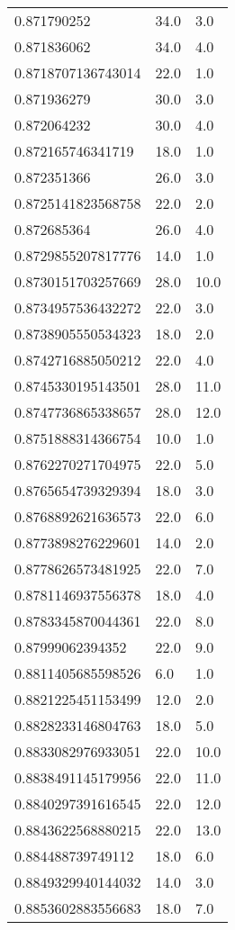 \begin{center}
\begin{supertabular}[H]{p{0.30\textwidth}p{0.05\textwidth}p{0.05\textwidth}}
0.871790252 & 34.0 & 3.0 \\ 
0.871836062 & 34.0 & 4.0 \\ 
0.8718707136743014 & 22.0 & 1.0 \\ 
0.871936279 & 30.0 & 3.0 \\ 
0.872064232 & 30.0 & 4.0 \\ 
0.872165746341719 & 18.0 & 1.0 \\ 
0.872351366 & 26.0 & 3.0 \\ 
0.8725141823568758 & 22.0 & 2.0 \\ 
0.872685364 & 26.0 & 4.0 \\ 
0.8729855207817776 & 14.0 & 1.0 \\ 
0.8730151703257669 & 28.0 & 10.0 \\ 
0.8734957536432272 & 22.0 & 3.0 \\ 
0.8738905550534323 & 18.0 & 2.0 \\ 
0.8742716885050212 & 22.0 & 4.0 \\ 
0.8745330195143501 & 28.0 & 11.0 \\ 
0.8747736865338657 & 28.0 & 12.0 \\ 
0.8751888314366754 & 10.0 & 1.0 \\ 
0.8762270271704975 & 22.0 & 5.0 \\ 
0.8765654739329394 & 18.0 & 3.0 \\ 
0.8768892621636573 & 22.0 & 6.0 \\ 
0.8773898276229601 & 14.0 & 2.0 \\ 
0.8778626573481925 & 22.0 & 7.0 \\ 
0.8781146937556378 & 18.0 & 4.0 \\ 
0.8783345870044361 & 22.0 & 8.0 \\ 
0.87999062394352 & 22.0 & 9.0 \\ 
0.8811405685598526 & 6.0 & 1.0 \\ 
0.8821225451153499 & 12.0 & 2.0 \\ 
0.8828233146804763 & 18.0 & 5.0 \\ 
0.8833082976933051 & 22.0 & 10.0 \\ 
0.8838491145179956 & 22.0 & 11.0 \\ 
0.8840297391616545 & 22.0 & 12.0 \\ 
0.8843622568880215 & 22.0 & 13.0 \\ 
0.884488739749112 & 18.0 & 6.0 \\ 
0.8849329940144032 & 14.0 & 3.0 \\ 
0.8853602883556683 & 18.0 & 7.0 \\ 

\end{supertabular}
\end{center}
